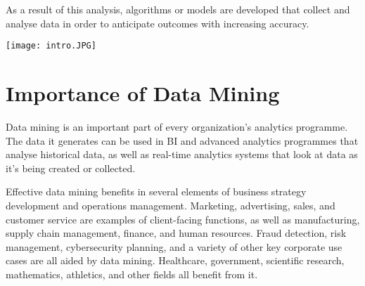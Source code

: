 \documentclass[12pt,letterpaper]{article}
\begin{document}
As a result of this analysis, algorithms or models are developed that collect and analyse data in order to anticipate outcomes with increasing accuracy.
\begin{center} \texttt{[image: intro.JPG]}
\end{center}
\section{Importance of Data Mining}
Data mining is an important part of every organization's analytics programme. The data it generates can be used in BI and advanced analytics programmes that analyse historical data, as well as real-time analytics systems that look at data as it's being created or collected.

Effective data mining benefits in several elements of business strategy development and operations management. Marketing, advertising, sales, and customer service are examples of client-facing functions, as well as manufacturing, supply chain management, finance, and human resources. Fraud detection, risk management, cybersecurity planning, and a variety of other key corporate use cases are all aided by data mining. Healthcare, government, scientific research, mathematics, athletics, and other fields all benefit from it.
\end{document}
